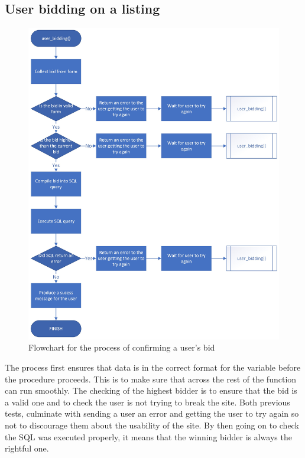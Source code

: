\subsection{User bidding on a listing}
\begin{figure}[H]
    \centering
    \includegraphics[scale=0.3]{ch2_design/c3_bidding2.jpeg}
    \caption{Flowchart for the process of confirming a user’s bid}
    \label{fig:flow_bidding}
\end{figure}
The process first ensures that data is in the correct format for the variable before the procedure proceeds. This is to make sure that across the rest of the function can run smoothly. The checking of the highest bidder is to ensure that the bid is a valid one and to check the user is not trying to break the site. Both previous tests, culminate with sending a user an error and getting the user to try again so not to discourage them about the usability of the site. By then going on to check the SQL was executed properly, it means that the winning bidder is always the rightful one. 



